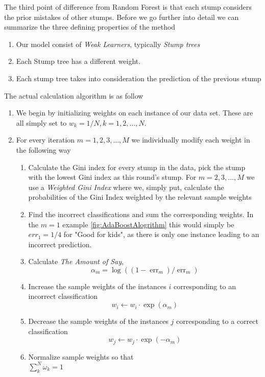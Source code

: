 The third point of difference from Random Forest is that each stump considers the prior mistakes of other stumps. Before we go further into detail we can summarize the three defining properties of the method

\begin{enumerate}
    \item Our model consist of \textit{Weak Learners}, typically \textit{Stump trees}
    \item Each Stump tree has a different weight.
    \item Each stump tree takes into consideration the prediction of the previous stump
\end{enumerate}

The actual calculation algorithm is as follow
\begin{enumerate}
    \item 
    We begin by initializing weights on each instance of our data set. These are all simply set to $w_{k}=1 / N, k=1,2, \ldots, N$.
    \item For every iteration $m=1,2,3, \ldots, M$ we individually modify each weight in the following way
    \begin{enumerate}
        \item Calculate the Gini index for every stump in the data, pick the stump with the lowest Gini index as this round's stump. For $m=2,3, \ldots, M$ we use a \textit{Weighted Gini Index} where we, simply put, calculate the probabilities of the Gini Index weighted by the relevant sample weights
        \item Find the incorrect classifications and sum the corresponding weights.
        In the $m=1$ example \cref{fig:AdaBoostAlogrithm} this would simply be $err_1 = 1/4$ for "Good for kids", as there is only one instance leading to an incorrect prediction.
        \item Calculate \textit{The Amount of Say}, 
        \begin{equation}
        \alpha_{m}=\log \left(\left(1-\operatorname{err}_{m}\right) / \operatorname{err}_{m}\right)
        \end{equation}
        \item Increase the sample weights of the instances $i$ corresponding to an incorrect classification 
        \begin{equation}
            w_{i} \leftarrow w_{i} \cdot \exp \left(\alpha_{m}\right)
        \end{equation}
        \item Decrease the sample weights of the instances $j$ corresponding to a correct classification
        \begin{equation}
            w_{j} \leftarrow w_{j} \cdot \exp \left(-\alpha_{m}\right)
        \end{equation}
        \item Normalize sample weights so that \\ $\sum_k^N \omega_k =1$
    \end{enumerate}
\end{enumerate}\cite{STATQUEST}\cite[p.~339]{statelem}


